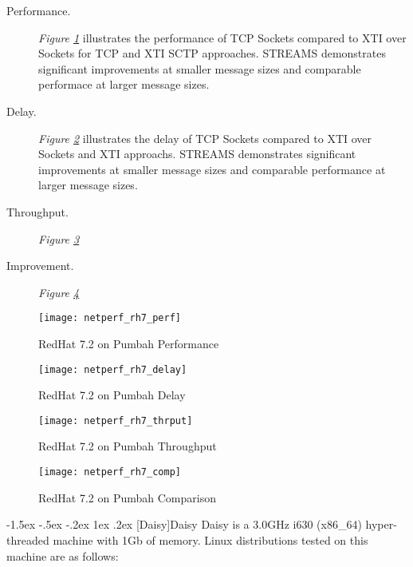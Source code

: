 \documentclass[letterpaper,final,notitlepage,twocolumn,10pt,twoside]{article}
\makeatletter
\renewcommand\subsection{\@startsection{subsection}{2}{\z@}%
                                     {-1.5ex \@plus -.5ex \@minus -.2ex}%
                                     {1ex \@plus .2ex}%
                                     {\normalfont\normalsize\bfseries}}
\makeatother
\begin{document}
\begin{description}

\item[Performance.]

\textit{Figure \ref{figure:rh7perf}}
illustrates the performance of TCP Sockets compared to XTI over Sockets for
TCP and XTI SCTP approaches.  STREAMS demonstrates significant improvements at
smaller message sizes and comparable performace at larger message sizes.

\item[Delay.]

\textit{Figure \ref{figure:rh7dly}}
illustrates the delay of TCP Sockets compared to XTI over Sockets and XTI
approachs.  STREAMS demonstrates significant improvements at smaller message
sizes and comparable performance at larger message sizes.

\item[Throughput.]

\textit{Figure \ref{figure:rh7thrput}}

\item[Improvement.]

\textit{Figure \ref{figure:rh7comp}}

\end{description}

\begin{figure}[p]
\center\texttt{[image: netperf\_rh7\_perf]}
\caption[RedHat 7.2 on Pumbah Performance]{RedHat 7.2 on Pumbah Performance}
\label{figure:rh7perf}
\end{figure}

\begin{figure}[p]
\center\texttt{[image: netperf\_rh7\_delay]}
\caption[RedHat 7.2 on Pumbah Delay]{RedHat 7.2 on Pumbah Delay}
\label{figure:rh7dly}
\end{figure}

\begin{figure}[p]
\center\texttt{[image: netperf\_rh7\_thrput]}
\caption[RedHat 7.2 on Pumbah Throughput]{RedHat 7.2 on Pumbah Throughput}
\label{figure:rh7thrput}
\end{figure}

\begin{figure}[p]
\center\texttt{[image: netperf\_rh7\_comp]}
\caption[RedHat 7.2 on Pumbah Comparison]{RedHat 7.2 on Pumbah Comparison}
\label{figure:rh7comp}
\end{figure}

\subsection[Daisy]{Daisy}
Daisy is a 3.0GHz i630 (x86\_64) hyper-threaded machine with 1Gb of memory.
Linux distributions tested on this machine are as follows:
\end{document}
